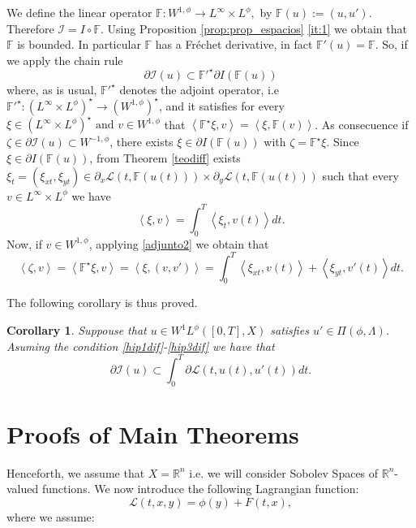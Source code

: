 \documentclass[twoside]{article}
\theoremstyle{definition}
\theoremstyle{plain}
\newtheorem{Cor}[definition]{Corollary}
\theoremstyle{remark}
\newcommand{\lphi}{L^{\phi}}
\newcommand{\wphi}{W^{1}\lphi}
\begin{document}
We define the linear operator $\mathbb{F}:W ^{1,\phi} \to  L^\infty  \times L^\phi ,$
by $\mathbb{F}(u):=(u,u')$. Therefore $\mathcal{I}=I \circ \mathbb{F}$.  Using Proposition \ref{prop:prop_espacios} \eqref{it:1}   we obtain that $\mathbb{F}$ is bounded. In particular $\mathbb{F}$ has a Fréchet derivative, in fact $\mathbb{F}'(u)=\mathbb{F}$. So, if we apply the chain rule \cite[Th. 10.19]{clarke2013functional}
\[\partial \mathcal{I}(u)\subset \mathbb{F}'^\star \partial I(\mathbb{F}(u))\]
where, as is usual, $\mathbb{F}'^\star$ denotes the adjoint operator, i.e $\mathbb{F}'^\star:(L^\infty\times L^\phi)^\star \to (W ^{1,\phi})^\star$, and it satisfies for every $\xi \in (L^\infty\times L^\phi)^\star \text{ and } v \in W ^{1,\phi}$ that
$   \left<\mathbb{F}^\star\xi, v\right>=\left<\xi, \mathbb{F} (v)\right>
$.
As consecuence if $\zeta \in \partial \mathcal{I}(u)\subset W^{-1,\phi}$, there exists $\xi \in \partial I(\mathbb{F}(u)) $ with $ \zeta=\mathbb{F}^\star\xi $. Since $\xi \in \partial I(\mathbb{F}(u))$, from Theorem \ref{teodiff} exists $\xi_t=(\xi_{xt},\xi_{yt}) \in \partial_{x} \mathcal{L}(t,\mathbb{F}(u(t)))\times \partial_{y} \mathcal{L}(t,\mathbb{F}(u(t))) $ such that every $v \in L^\infty\times L^\phi$ we have
\begin{equation}\label{adjunto2}
   \left<\xi, v\right>=\int_0^T \left<\xi_t , v(t)\right> dt. 
\end{equation}
Now, if $v \in W ^{1,\phi}$, applying \eqref{adjunto2} we obtain that
\begin{equation}\label{adjunto1}
  \left<\zeta, v\right>=\left<\mathbb{F}^\star\xi, v\right>=\left<\xi, (v,v')\right>=\int_0^T \left<\xi_{xt} , v(t)\right>+\left<\xi_{yt} , v'(t)\right> dt.  
\end{equation}

The following corollary is thus proved.
\begin{Cor}\label{inclusionderivadafuncional} Suppouse that $u \in \wphi([0,T], X)$ satisfies $ u' \in \Pi(\phi, \Lambda)$. Asuming the condition \ref{hip1dif}-\ref{hip3dif} we have that \[\partial \mathcal{I}(u)\subset \int_0^T \partial \mathcal{L}(t,u(t),u'(t))dt.\]
\end{Cor}

\section{Proofs of Main Theorems}
Henceforth, we assume that $X=\mathbb{R}^n$ i.e. we will consider Sobolev Spaces of $\mathbb{R}^n$-valued functions. We now introduce the following Lagrangian function:
\begin{equation}
\mathcal{L}(t,x,y)=\phi(y)+F(t,x),
\end{equation}
where we assume:
\end{document}
